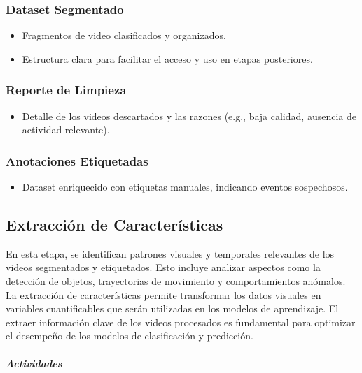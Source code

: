 \subsubsection{Dataset Segmentado}
\begin{itemize}
    \item Fragmentos de video clasificados y organizados.
    \item Estructura clara para facilitar el acceso y uso en etapas posteriores.
\end{itemize}


\subsubsection{Reporte de Limpieza}
\begin{itemize}
    \item Detalle de los videos descartados y las razones (e.g., baja calidad, ausencia de actividad relevante).
\end{itemize}


\subsubsection{Anotaciones Etiquetadas}
\begin{itemize}
    \item Dataset enriquecido con etiquetas manuales, indicando eventos sospechosos.
\end{itemize}




\subsection{Extracción de Características}

En esta etapa, se identifican patrones visuales y temporales relevantes de los videos segmentados y etiquetados. Esto incluye analizar aspectos como la detección de objetos, trayectorias de movimiento y comportamientos anómalos. La extracción de características permite transformar los datos visuales en variables cuantificables que serán utilizadas en los modelos de aprendizaje.
El extraer información clave de los videos procesados es fundamental para optimizar el desempeño de los modelos de clasificación y predicción.


\paragraph{\textit{Actividades}}

